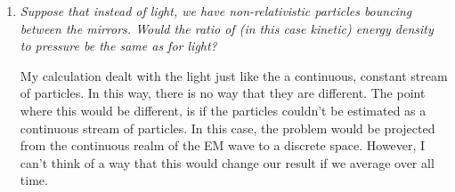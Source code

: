 \documentclass[12pt]{article}
\begin{document}
\begin{enumerate}[label=\alph*)]
\item {\sl Suppose that instead of light, we have non-relativistic particles bouncing between the mirrors. Would the ratio of (in this case kinetic) energy density to pressure be the same as for light?}

My calculation dealt with the light just like the a continuous, constant stream of particles. In this way, there is no way that they are different. The point where this would be different, is if the particles couldn't be estimated as a continuous stream of particles. In this case, the problem would be projected from the continuous realm of the EM wave to a discrete space. However, I can't think of a way that this would change our result if we average over all time.

\end{enumerate}
\end{document}
